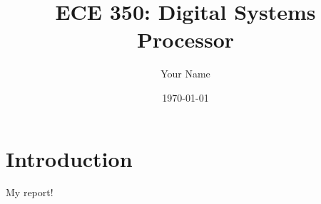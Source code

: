 \documentclass[letterpaper]{article} %
\begin{document}
\title{ECE 350: Digital Systems Processor}
\author{Your Name}
\date{\today}
\maketitle

\section{Introduction}
My report!
\end{document}
